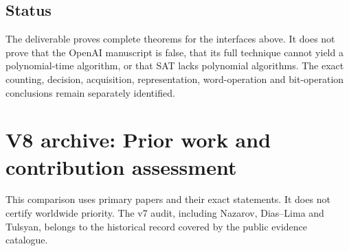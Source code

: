 \documentclass[11pt,a4paper]{article}
\begin{document}
\subsection{Status}\label{v8-status}

The deliverable proves complete theorems for the interfaces above. It
does not prove that the OpenAI manuscript is false, that its full
technique cannot yield a polynomial-time algorithm, or that SAT lacks
polynomial algorithms. The exact counting, decision, acquisition,
representation, word-operation and bit-operation conclusions remain
separately identified.

\section{V8 archive: Prior work and contribution assessment}\label{v8-section-contribution-audit}

This comparison uses primary papers and their exact statements. It does
not certify worldwide priority. The v7 audit, including Nazarov,
Dias--Lima and Tulsyan, belongs to the historical record covered
by the public evidence catalogue.
\end{document}
